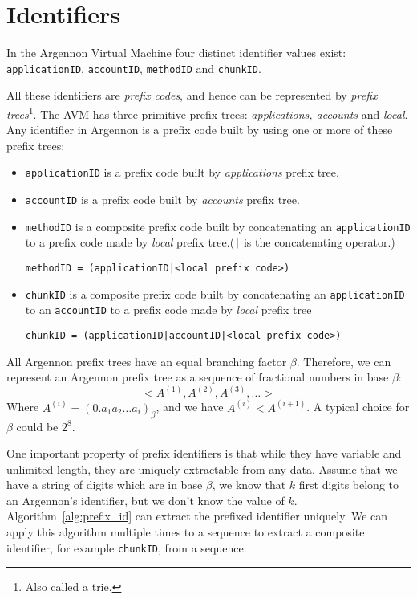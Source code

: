\section{Identifiers}\label{sec:identifiers}

In the Argennon Virtual Machine four distinct identifier values exist: \texttt{applicationID}, \texttt{accountID},
\texttt{methodID} and \texttt{chunkID}.

All these identifiers are \emph{prefix codes}, and hence can be represented by
\emph{prefix trees}\footnote{Also called a trie.}. The AVM has three primitive prefix trees:
\emph{applications, accounts} and \emph{local}. Any identifier in Argennon is a
prefix code built by using one or more of these prefix trees:
\begin{itemize}
    \item \texttt{applicationID} is a prefix code built by \emph{applications} prefix tree.
    \item \texttt{accountID} is a prefix code built by \emph{accounts} prefix tree.
    \item \texttt{methodID} is a composite prefix code built by concatenating an \texttt{applicationID} to
    a prefix code made by \emph{local} prefix tree.(\texttt{|} is the concatenating operator.)

    \texttt{methodID = (applicationID|<local prefix code>)}
    \item \texttt{chunkID} is a composite prefix code built by concatenating an \texttt{applicationID} to
    an \texttt{accountID} to a prefix code made by \emph{local} prefix tree

    \texttt{chunkID = (applicationID|accountID|<local prefix code>)}
\end{itemize}

All Argennon prefix trees have an equal branching factor \(\beta\). Therefore, we can represent an Argennon
prefix tree as a sequence of fractional numbers in base \(\beta\):
\[
    <A^{(1)},A^{(2)},A^{(3)},\dots>
\]
Where \(A^{(i)}=(0.a_{1}a_{2}\dots a_{i})_\beta\), and we have \(A^{(i)}<A^{(i+1)}\). A typical choice for \(\beta\)
could be \(2^8\).

One important property of prefix identifiers is that while they have variable and unlimited length, they are
uniquely extractable from any data. Assume that we have a string of digits which are in base $\beta$, we
know that $k$ first digits belong to an Argennon's identifier, but we don't know the value of $k$.
Algorithm~\ref{alg:prefix_id} can extract the prefixed identifier uniquely. We can apply this algorithm
multiple times to a sequence to extract a composite identifier, for example \texttt{chunkID}, from a sequence.


